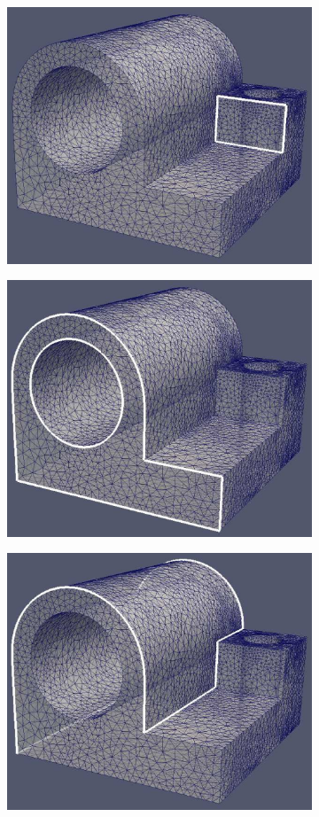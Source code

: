 \begin{figure}
\centering
\begin{subfigure}{.5\textwidth}
  \centering
  \includegraphics[width=.8\linewidth]{img/m1/surfSegmentation/surf0.eps}
  \caption{}
  \label{surf0}
\end{subfigure}%
\begin{subfigure}{.5\textwidth}
  \centering
  \includegraphics[width=.8\linewidth]{img/m1/surfSegmentation/surf3.eps}
  \caption{}
  \label{surf1}
\end{subfigure}
\begin{subfigure}{.5\textwidth}
  \centering
  \includegraphics[width=.8\linewidth]{img/m1/surfSegmentation/surf5.eps}

\end{subfigure}
\end{figure}
